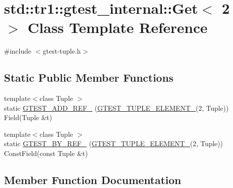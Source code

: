 \hypertarget{classstd_1_1tr1_1_1gtest__internal_1_1Get_3_012_01_4}{}\section{std\+:\+:tr1\+:\+:gtest\+\_\+internal\+:\+:Get$<$ 2 $>$ Class Template Reference}
\label{classstd_1_1tr1_1_1gtest__internal_1_1Get_3_012_01_4}


{\ttfamily \#include $<$gtest-\/tuple.\+h$>$}

\subsection*{Static Public Member Functions}
\begin{DoxyCompactItemize}
\item 
{\footnotesize template$<$class Tuple $>$ }\\static \hyperlink{classstd_1_1tr1_1_1gtest__internal_1_1Get_3_012_01_4_a8dfe7b5c1c915f10181e3fb5952ba6d8}{G\+T\+E\+S\+T\+\_\+\+A\+D\+D\+\_\+\+R\+E\+F\+\_\+} (\hyperlink{gtest-tuple_8h_a1b7f133d8aa02e0b7afed7b66781eeb7}{G\+T\+E\+S\+T\+\_\+\+T\+U\+P\+L\+E\+\_\+\+E\+L\+E\+M\+E\+N\+T\+\_\+}(2, Tuple)) Field(Tuple \&t)
\item 
{\footnotesize template$<$class Tuple $>$ }\\static \hyperlink{classstd_1_1tr1_1_1gtest__internal_1_1Get_3_012_01_4_a76127c9c03c1f0caa61fb87d4d756b5b}{G\+T\+E\+S\+T\+\_\+\+B\+Y\+\_\+\+R\+E\+F\+\_\+} (\hyperlink{gtest-tuple_8h_a1b7f133d8aa02e0b7afed7b66781eeb7}{G\+T\+E\+S\+T\+\_\+\+T\+U\+P\+L\+E\+\_\+\+E\+L\+E\+M\+E\+N\+T\+\_\+}(2, Tuple)) Const\+Field(const Tuple \&t)
\end{DoxyCompactItemize}


\subsection{Member Function Documentation}
